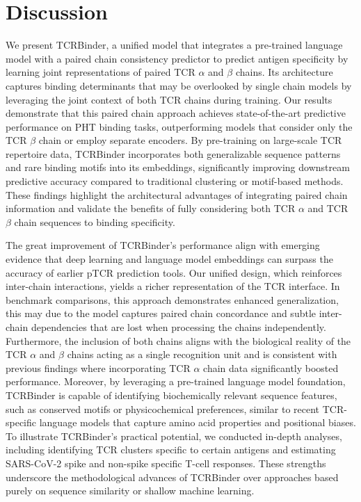 \documentclass[10pt,letterpaper]{article}
\begin{document}
\section*{Discussion}
We present TCRBinder, a unified model that integrates a pre-trained language model with a paired chain consistency predictor to predict antigen specificity by learning joint representations of paired TCR $\alpha$ and $\beta$ chains. Its architecture captures binding determinants that may be overlooked by single chain models by leveraging the joint context of both TCR chains during training. Our results demonstrate that this paired chain approach achieves state-of-the-art predictive performance on PHT binding tasks, outperforming models that consider only the TCR $\beta$ chain or employ separate encoders. By pre-training on large-scale TCR repertoire data, TCRBinder incorporates both generalizable sequence patterns and rare binding motifs into its embeddings, significantly improving downstream predictive accuracy compared to traditional clustering or motif-based methods. These findings highlight the architectural advantages of integrating paired chain information and validate the benefits of fully considering both TCR $\alpha$ and TCR $\beta$ chain sequences to binding specificity.


The great improvement of TCRBinder’s performance align with emerging evidence that deep learning and language model embeddings can surpass the accuracy of earlier pTCR prediction tools. Our unified design, which reinforces inter-chain interactions, yields a richer representation of the TCR interface. In benchmark comparisons, this approach demonstrates enhanced generalization, this may due to the model captures paired chain concordance and subtle inter-chain dependencies that are lost when processing the chains independently. Furthermore, the inclusion of both chains aligns with the biological reality of the TCR $\alpha$ and $\beta$ chains acting as a single recognition unit and is consistent with previous findings where incorporating TCR $\alpha$ chain data significantly boosted performance. Moreover, by leveraging a pre-trained language model foundation, TCRBinder is capable of identifying biochemically relevant sequence features, such as conserved motifs or physicochemical preferences, similar to recent TCR-specific language models that capture amino acid properties and positional biases. To illustrate TCRBinder's practical potential, we conducted in-depth analyses, including identifying TCR clusters specific to certain antigens and estimating SARS-CoV-2 spike and non-spike specific T-cell responses. These strengths underscore the methodological advances of TCRBinder over approaches based purely on sequence similarity or shallow machine learning.
\end{document}
